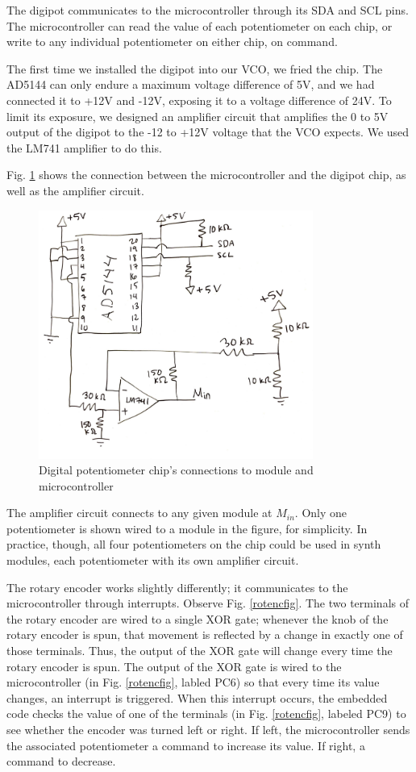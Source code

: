 \documentclass[letterpaper, 12 pt, conference]{ieeeconf}
\begin{document}
The digipot communicates to the microcontroller through its SDA and SCL pins. The microcontroller can read the value of each potentiometer on each chip, or write to any individual potentiometer on either chip, on command. 

The first time we installed the digipot into our VCO, we fried the chip. The AD5144 can only endure a maximum voltage difference of 5V, and we had connected it to +12V and -12V, exposing it to a voltage difference of 24V. To limit its exposure, we designed an amplifier circuit that amplifies the 0 to 5V output of the digipot to the -12 to +12V voltage that the VCO expects. We used the LM741 amplifier to do this. 

Fig. \ref{digfig} shows the connection between the microcontroller and the digipot chip, as well as the amplifier circuit. 

\begin{figure}[ht]
\includegraphics[width=9cm]{digipot}
\centering
\caption{Digital potentiometer chip's connections to module and microcontroller}
\label{digfig}
\end{figure}
The amplifier circuit connects to any given module at $M_{in}$. Only one potentiometer is shown wired to a module in the figure, for simplicity. In practice, though, all four potentiometers on the chip could be used in synth modules, each potentiometer with its own amplifier circuit.


The rotary encoder works slightly differently; it communicates to the microcontroller through interrupts. Observe Fig. \ref{rotencfig}. The two terminals of the rotary encoder are wired to a single XOR gate; whenever the knob of the rotary encoder is spun, that movement is reflected by a change in exactly one of those terminals. Thus, the output of the XOR gate will change every time the rotary encoder is spun. The output of the XOR gate is wired to the microcontroller (in Fig. \ref{rotencfig}, labled PC6) so that every time its value changes, an interrupt is triggered. When this interrupt occurs, the embedded code checks the value of one of the terminals (in Fig. \ref{rotencfig}, labeled PC9) to see whether the encoder was turned left or right. If left, the microcontroller sends the associated potentiometer a command to increase its value. If right, a command to decrease. 
\end{document}
